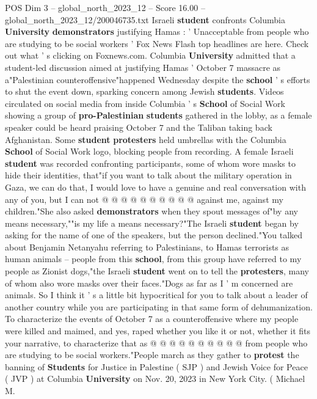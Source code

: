 \begin{textsample}{POS Dim 3 – global\_north\_2023\_12 – Score 16.00 – global\_north\_2023\_12/200046735.txt}  \label{ex:f3_pos_221}
Israeli \textbf{student} confronts Columbia \textbf{University} \textbf{demonstrators} justifying Hamas : ' Unacceptable from people who are studying to be social workers ' Fox News Flash top headlines are here.
Check out what ' s clicking on Foxnews.com.
Columbia \textbf{University} admitted that a student-led discussion aimed at justifying Hamas ' October 7 massacre as a"Palestinian counteroffensive"happened Wednesday despite the \textbf{school} ' s efforts to shut the event down, sparking concern among Jewish \textbf{students}.
Videos circulated on social media from inside Columbia ' s \textbf{School} of Social Work showing a group of \textbf{pro-Palestinian} \textbf{students} gathered in the lobby, as a female speaker could be heard praising October 7 and the Taliban taking back Afghanistan.
Some \textbf{student} \textbf{protesters} held umbrellas with the Columbia \textbf{School} of Social Work logo, blocking people from recording.
A female Israeli \textbf{student} was recorded confronting participants, some of whom wore masks to hide their identities, that"if you want to talk about the military operation in Gaza, we can do that, I would love to have a genuine and real conversation with any of you, but I can not @ @ @ @ @ @ @ @ @ @ against me, against my children."She also asked \textbf{demonstrators} when they spout messages of"by any means necessary,""is my life a means necessary?"The Israeli \textbf{student} began by asking for the name of one of the speakers, but the person declined."You talked about Benjamin Netanyahu referring to Palestinians, to Hamas terrorists as human animals -- people from this \textbf{school}, from this group have referred to my people as Zionist dogs,"the Israeli \textbf{student} went on to tell the \textbf{protesters}, many of whom also wore masks over their faces."Dogs as far as I ' m concerned are animals.
So I think it ' s a little bit hypocritical for you to talk about a leader of another country while you are participating in that same form of dehumanization.
To characterize the events of October 7 as a counteroffensive where my people were killed and maimed, and yes, raped whether you like it or not, whether it fits your narrative, to characterize that as @ @ @ @ @ @ @ @ @ @ from people who are studying to be social workers."People march as they gather to \textbf{protest} the banning of \textbf{Students} for Justice in Palestine ( SJP ) and Jewish Voice for Peace ( JVP ) at Columbia \textbf{University} on Nov. 20, 2023 in New York City. ( Michael M.

\end{textsample}
